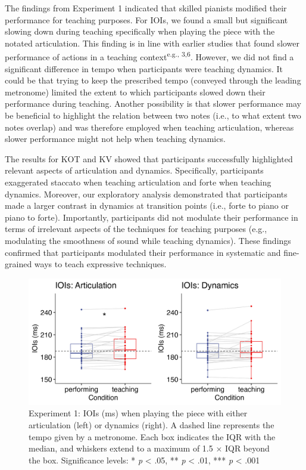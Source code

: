 \documentclass[
  man,floatsintext]{apa6}
\begin{document}
The findings from Experiment 1 indicated that skilled pianists modified their performance for teaching purposes. For IOIs, we found a small but significant slowing down during teaching specifically when playing the piece with the notated articulation. This finding is in line with earlier studies that found slower performance of actions in a teaching context\textsuperscript{e.g., 3,6}. However, we did not find a significant difference in tempo when participants were teaching dynamics. It could be that trying to keep the prescribed tempo (conveyed through the leading metronome) limited the extent to which participants slowed down their performance during teaching. Another possibility is that slower performance may be beneficial to highlight the relation between two notes (i.e., to what extent two notes overlap) and was therefore employed when teaching articulation, whereas slower performance might not help when teaching dynamics.

The results for KOT and KV showed that participants successfully highlighted relevant aspects of articulation and dynamics. Specifically, participants exaggerated staccato when teaching articulation and forte when teaching dynamics. Moreover, our exploratory analysis demonstrated that participants made a larger contrast in dynamics at transition points (i.e., forte to piano or piano to forte). Importantly, participants did not modulate their performance in terms of irrelevant aspects of the techniques for teaching purposes (e.g., modulating the smoothness of sound while teaching dynamics). These findings confirmed that participants modulated their performance in systematic and fine-grained ways to teach expressive techniques.

\begin{figure}
\includegraphics[width=1\linewidth]{manuscript_files/figure-latex/plot-ioi-1-1} \caption{\label{fig:ioi-1}Experiment 1: IOIs (ms) when playing the piece with either articulation (left) or dynamics (right). A dashed line represents the tempo given by a metronome. Each box indicates the IQR with the median, and whiskers extend to a maximum of 1.5 × IQR beyond the box. Significance levels: * \textit{p} < .05, ** \textit{p} < .01, *** \textit{p} < .001}\label{fig:plot-ioi-1}
\end{figure}
\end{document}
